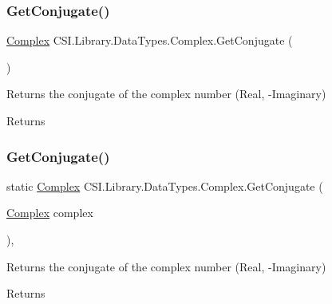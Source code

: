 \subsubsection{\texorpdfstring{GetConjugate()}{GetConjugate()}\hspace{0.1cm}{\footnotesize\ttfamily [1/2]}}
{\footnotesize\ttfamily \mbox{\hyperlink{struct_c_s_i_1_1_library_1_1_data_types_1_1_complex}{Complex}} C\+S\+I.\+Library.\+Data\+Types.\+Complex.\+Get\+Conjugate (\begin{DoxyParamCaption}{ }\end{DoxyParamCaption})\hspace{0.3cm}{\ttfamily [inline]}}



Returns the conjugate of the complex number (Real, -\/Imaginary) 

\begin{DoxyReturn}{Returns}

\end{DoxyReturn}
\mbox{\label{struct_c_s_i_1_1_library_1_1_data_types_1_1_complex_aebdc6dc8b3f0fc043388007288cc361a}} 
\subsubsection{\texorpdfstring{GetConjugate()}{GetConjugate()}\hspace{0.1cm}{\footnotesize\ttfamily [2/2]}}
{\footnotesize\ttfamily static \mbox{\hyperlink{struct_c_s_i_1_1_library_1_1_data_types_1_1_complex}{Complex}} C\+S\+I.\+Library.\+Data\+Types.\+Complex.\+Get\+Conjugate (\begin{DoxyParamCaption}\item[{\mbox{\hyperlink{struct_c_s_i_1_1_library_1_1_data_types_1_1_complex}{Complex}}}]{complex }\end{DoxyParamCaption})\hspace{0.3cm}{\ttfamily [inline]}, {\ttfamily [static]}}



Returns the conjugate of the complex number (Real, -\/Imaginary) 

\begin{DoxyReturn}{Returns}

\end{DoxyReturn}
\mbox{\label{struct_c_s_i_1_1_library_1_1_data_types_1_1_complex_a9e878f7f5867e6f513d57537cdf4dd55}} 
